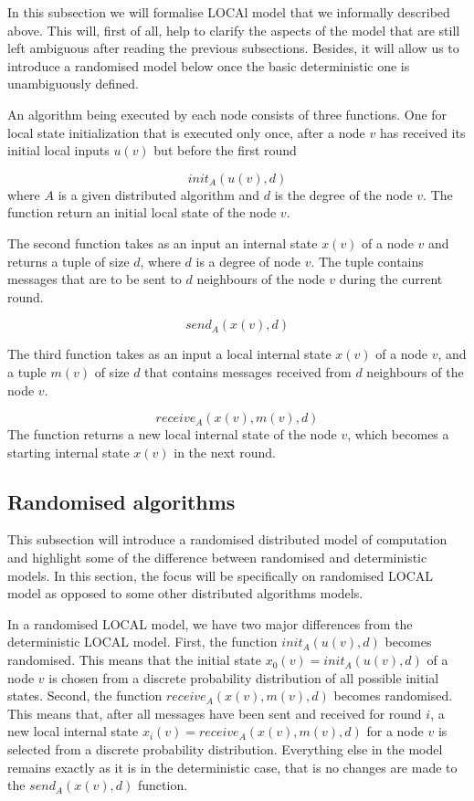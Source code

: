In this subsection we will formalise LOCAl model that we informally described above.
This will, first of all, help to clarify the aspects of the model that are still left ambiguous
after reading the previous subsections. Besides, it will allow us to introduce
a randomised model below once the basic deterministic one is unambiguously defined.

An algorithm being executed by each node consists of 
three functions. One for local state initialization that is executed only once, after
a node $v$ has received its initial local inputs $u(v)$ but before the first round

$$init_A(u(v), d)$$
where $A$ is a given distributed algorithm and $d$ is the degree of the node $v$.
The function return an initial local state of the node $v$.

The second function takes as an input an internal state $x(v)$ of a node $v$
and returns a tuple of size $d$, where $d$ is a degree of node $v$. The
tuple contains messages that are to be sent to $d$ neighbours of the node $v$
during the current round.

$$send_A(x(v), d)$$

The third function takes as an input a local internal state $x(v)$ of a node
$v$, and a tuple $m(v)$ of size $d$ that contains messages received from $d$ neighbours
of the node $v$.

$$receive_A(x(v), m(v), d)$$
The function returns a new local internal state of the node $v$, which becomes a
starting internal state $x(v)$ in the next round.

\subsection{Randomised algorithms}

This subsection will introduce a randomised distributed model of computation
and highlight some of the difference between randomised and deterministic
models. In this section, the focus will be specifically on randomised LOCAL
model as opposed to some other distributed algorithms models.

In a randomised LOCAL model, we have two major differences from the
deterministic LOCAL model. First, the function $init_A(u(v), d)$ becomes
randomised. This means that the initial state $x_0(v) = init_A(u(v), d)$ of a node $v$ is
chosen from a discrete probability distribution of all possible initial states.
Second, the function $receive_A(x(v), m(v), d)$ becomes randomised. This means that,
after all messages have been sent and received for round $i$, a new local internal
state $x_i(v) = receive_A(x(v), m(v), d)$ for a node $v$ is selected from a
discrete probability distribution. Everything else in the model remains exactly
as it is in the deterministic case, that is no changes are made to the $send_A(x(v), d)$
function.

